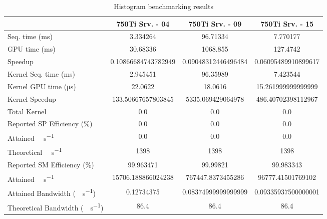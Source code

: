 \begin{table}[H]
	\centering
	\caption{Histogram benchmarking results}
	\label{tab:histogram-results}
	\begin{tabular}{lS[table-format=7.1]S[table-format=7.1]S[table-format=7.1]}
		\toprule
			~ & {\textbf{750Ti Srv. - 04}} & {\textbf{750Ti Srv. - 09}} & {\textbf{750Ti Srv. - 15}} \\
		\midrule
			{Seq. time (\si{\milli\second})} & 3.334264 & 96.71334 & 7.770177 \\
			{GPU time (\si{\milli\second})} & 30.68336 & 1068.855 & 127.4742 \\
			{Speedup} & 0.10866684743782949 &0.09048312446496484 & 0.06095489910899617 \\
		\midrule
			{Kernel Seq. time (\si{\milli\second})} & 2.945451 & 96.35989 & 7.423544 \\
			{Kernel GPU time (\si{\micro\second})} & 22.0622 & 18.0616 & 15.261999999999999 \\
			{Kernel Speedup} & 133.50667657803845 & 5335.069429064978 & 486.40702398112967 \\
		\midrule
			{Total Kernel \si{\mega\flops}} & 0.0 & 0.0 & 0.0 \\
			{Reported SP Efficiency (\si{\percent})} & 0.0 & 0.0 & 0.0 \\
			{Attained \si{\giga\flops\per\second}} & 0.0 & 0.0 & 0.0 \\
			{Theoretical \si{\giga\flops\per\second}} & 1398 & 1398 & 1398 \\
		\midrule
			{Reported SM Efficiency (\si{\percent})} & 99.963471 & 99.99821 & 99.983343 \\
			{Attained \si{\giga\iops\per\second}} & 15706.188866024238 & 767447.8373455286 & 96777.41501769102 \\			
		\midrule
			{Attained Bandwidth (\si{\giga\byte\per\second})} & 0.12734375 & 0.08374999999999999  & 0.09335937500000001 \\
			{Theoretical Bandwidth (\si{\giga\byte\per\second})}	& 86.4 & 86.4 & 86.4 \\
		\bottomrule
	\end{tabular}
\end{table}